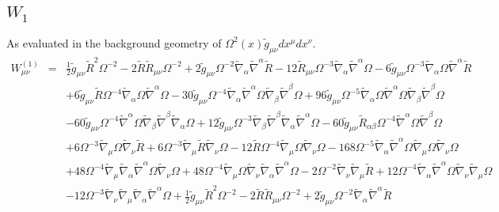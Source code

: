 \documentclass[10pt,letterpaper]{article}
\numberwithin{equation}{section}
\begin{document}
\subsection{$W_1$}
As evaluated in the background geometry of $\Omega^2(x)\tilde g_{\mu\nu}dx^\mu dx^\nu$.
\begin{eqnarray}
W^{(1)}_{\mu\nu}&=& \tfrac{1}{2} \tilde g_{\mu \nu } \tilde R^2 \Omega^{-2} - 2 \tilde R \tilde R_{\mu \nu } \Omega^{-2} + 2 \tilde g_{\mu \nu } \Omega^{-2} \tilde\nabla_{\alpha }\tilde\nabla^{\alpha }\tilde R - 12 \tilde R_{\mu \nu } \Omega^{-3} \tilde\nabla_{\alpha }\tilde\nabla^{\alpha }\Omega - 6 \tilde g_{\mu \nu } \Omega^{-3} \tilde\nabla_{\alpha }\Omega \tilde\nabla^{\alpha }\tilde R \nonumber \\ 
&& + 6 \tilde g_{\mu \nu } \tilde R \Omega^{-4} \tilde\nabla_{\alpha }\Omega \tilde\nabla^{\alpha }\Omega - 30 \tilde g_{\mu \nu } \Omega^{-4} \tilde\nabla_{\alpha }\tilde\nabla^{\alpha }\Omega \tilde\nabla_{\beta }\tilde\nabla^{\beta }\Omega + 96 \tilde g_{\mu \nu } \Omega^{-5} \tilde\nabla_{\alpha }\Omega \tilde\nabla^{\alpha }\Omega \tilde\nabla_{\beta }\tilde\nabla^{\beta }\Omega \nonumber \\ 
&& - 60 \tilde g_{\mu \nu } \Omega^{-4} \tilde\nabla^{\alpha }\Omega \tilde\nabla_{\beta }\tilde\nabla^{\beta }\tilde\nabla_{\alpha }\Omega + 12 \tilde g_{\mu \nu } \Omega^{-3} \tilde\nabla_{\beta }\tilde\nabla^{\beta }\tilde\nabla_{\alpha }\tilde\nabla^{\alpha }\Omega - 60 \tilde g_{\mu \nu } \tilde R_{\alpha \beta } \Omega^{-4} \tilde\nabla^{\alpha }\Omega \tilde\nabla^{\beta }\Omega \nonumber \\ 
&& + 6 \Omega^{-3} \tilde\nabla_{\mu }\Omega \tilde\nabla_{\nu }\tilde R + 6 \Omega^{-3} \tilde\nabla_{\mu }\tilde R \tilde\nabla_{\nu }\Omega - 12 \tilde R \Omega^{-4} \tilde\nabla_{\mu }\Omega \tilde\nabla_{\nu }\Omega - 168 \Omega^{-5} \tilde\nabla_{\alpha }\tilde\nabla^{\alpha }\Omega \tilde\nabla_{\mu }\Omega \tilde\nabla_{\nu }\Omega \nonumber \\ 
&& + 48 \Omega^{-4} \tilde\nabla_{\mu }\tilde\nabla_{\alpha }\tilde\nabla^{\alpha }\Omega \tilde\nabla_{\nu }\Omega + 48 \Omega^{-4} \tilde\nabla_{\mu }\Omega \tilde\nabla_{\nu }\tilde\nabla_{\alpha }\tilde\nabla^{\alpha }\Omega - 2 \Omega^{-2} \tilde\nabla_{\nu }\tilde\nabla_{\mu }\tilde R + 12 \Omega^{-4} \tilde\nabla_{\alpha }\tilde\nabla^{\alpha }\Omega \tilde\nabla_{\nu }\tilde\nabla_{\mu }\Omega \nonumber \\ 
&& - 12 \Omega^{-3} \tilde\nabla_{\nu }\tilde\nabla_{\mu }\tilde\nabla_{\alpha }\tilde\nabla^{\alpha }\Omega +\tfrac{1}{2} \tilde g_{\mu \nu } \tilde R^2 \Omega^{-2} - 2 \tilde R \tilde R_{\mu \nu } \Omega^{-2} + 2 \tilde g_{\mu \nu } \Omega^{-2} \tilde\nabla_{\alpha }\tilde\nabla^{\alpha }\tilde R \nonumber \\ 

\end{eqnarray}
\end{document}
